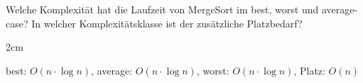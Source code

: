 \question[2]
Welche Komplexität hat die Laufzeit von MergeSort im best, worst und average-case?
In welcher Komplexitätsklasse ist der zusätzliche Platzbedarf?

\begin{solutionbox}{2cm}

best: $O(n \cdot \log n)$, average: $O(n \cdot \log n)$, worst: $O(n \cdot \log n)$, Platz: $O(n)$
\end{solutionbox}
